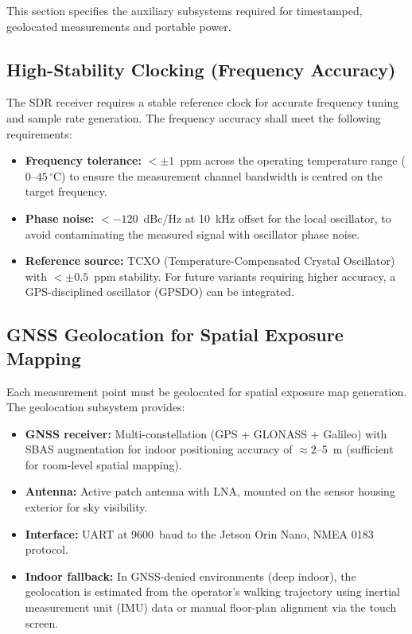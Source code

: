 \documentclass[11pt,a4paper]{article}
\begin{document}
This section specifies the auxiliary subsystems required for timestamped, geolocated measurements and portable power.

\subsection{High-Stability Clocking (Frequency Accuracy)}

The SDR receiver requires a stable reference clock for accurate frequency tuning and sample rate generation. The frequency accuracy shall meet the following requirements:

\begin{itemize}
    \item \textbf{Frequency tolerance:} $< \pm 1$~ppm across the operating temperature range ($0$--$45\,^{\circ}$C) to ensure the measurement channel bandwidth is centred on the target frequency.
    \item \textbf{Phase noise:} $< -120$~dBc/Hz at 10~kHz offset for the local oscillator, to avoid contaminating the measured signal with oscillator phase noise.
    \item \textbf{Reference source:} TCXO (Temperature-Compensated Crystal Oscillator) with $< \pm 0.5$~ppm stability. For future variants requiring higher accuracy, a GPS-disciplined oscillator (GPSDO) can be integrated.
\end{itemize}

\subsection{GNSS Geolocation for Spatial Exposure Mapping}

Each measurement point must be geolocated for spatial exposure map generation. The geolocation subsystem provides:

\begin{itemize}
    \item \textbf{GNSS receiver:} Multi-constellation (GPS + GLONASS + Galileo) with SBAS augmentation for indoor positioning accuracy of $\approx 2$--5~m (sufficient for room-level spatial mapping).
    \item \textbf{Antenna:} Active patch antenna with LNA, mounted on the sensor housing exterior for sky visibility.
    \item \textbf{Interface:} UART at 9600~baud to the Jetson Orin Nano, NMEA 0183 protocol.
    \item \textbf{Indoor fallback:} In GNSS-denied environments (deep indoor), the geolocation is estimated from the operator's walking trajectory using inertial measurement unit (IMU) data or manual floor-plan alignment via the touch screen.
\end{itemize}
\end{document}
